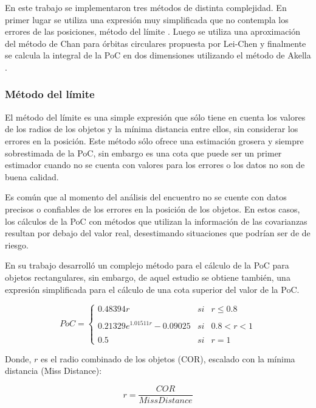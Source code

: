 En este trabajo se implementaron tres m\'etodos de distinta complejidad. En primer lugar se utiliza una expresi\'on muy simplificada que no contempla los errores de las posiciones, m\'etodo del l\'imite  \citep{alfano2008method}. Luego se utiliza una aproximaci\'on del m\'etodo de Chan \citep{chan2003improved} para \'orbitas circulares propuesta por Lei-Chen \citep{leichen} y finalmente se calcula la integral de la PoC en dos dimensiones utilizando el m\'etodo de Akella \citep{akellaAlfriend}.

\subsubsection{M\'etodo del l\'imite}
El m\'etodo del l\'imite es una simple expresi\'on que s\'olo tiene en cuenta los valores de los radios de los objetos y la m\'inima distancia entre ellos, sin considerar los errores en la posici\'on. Este m\'etodo s\'olo ofrece una estimaci\'on grosera y siempre sobrestimada de la PoC, sin embargo es una cota que puede ser un primer estimador cuando no se cuenta con valores para los errores o los datos no son de buena calidad. 

Es com\'un que al momento del an\'alisis  del encuentro no se cuente con datos precisos o confiables de los errores en la posici\'on de los objetos. En estos casos, los c\'alculos de la PoC con m\'etodos que utilizan la informaci\'on de las covarianzas resultan por debajo del valor real, desestimando situaciones que podr\'ian ser de de riesgo. 

En su trabajo \citep{alfano2008method} desarroll\'o un complejo m\'etodo para el c\'alculo de la PoC para objetos rectangulares, sin embargo, de aquel estudio se obtiene tambi\'en, una expresi\'on simplificada para el c\'alculo de una cota superior del valor de la PoC. 

$$
PoC= \left\{ \begin{array}{lcc}
             0.48394 r &   si  & r \leq 0.8 \\
             \\ 0.21329 e^{1.01511 r}-0.09025 &  si & 0.8 < r < 1 \\
             \\ 0.5 &  si  & r = 1
             \end{array}
   \right.
$$

Donde, $r$ es el radio combinado de los objetos (COR), escalado con la m\'inima distancia (Miss Distance): 

$$
 r = \frac{COR}{Miss Distance}
$$

